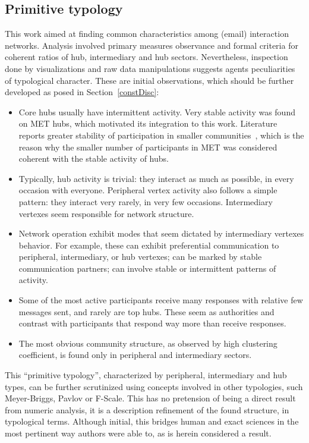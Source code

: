 \documentclass[%
 aip,
 jmp,%
 amsmath,amssymb,
 reprint,%
]{revtex4-1}
\begin{document}
    \subsection{Primitive typology}

This work aimed at finding common characteristics among (email) interaction networks. Analysis involved primary measures observance and formal criteria for coherent ratios of hub, intermediary and hub sectors. Nevertheless, inspection done by visualizations and raw data manipulations suggests agents peculiarities of typological character. These are initial observations, which should be further developed as posed in Section~\ref{constDisc}:

\begin{itemize}
    \item Core hubs usually have intermittent activity. Very stable activity was found on MET hubs, which motivated its integration to this work. Literature reports greater stability of participation in smaller communities~\cite{barabasiEvo}, which is the reason why the smaller number of participants in MET was considered coherent with the stable activity of hubs.
    \item Typically, hub activity is trivial: they interact as much as possible, in every occasion with everyone. Peripheral vertex activity also follows a simple pattern: they interact very rarely, in very few occasions. Intermediary vertexes seem responsible for network structure.
    \item Network operation exhibit modes that seem dictated by intermediary vertexes behavior. For example, these can exhibit preferential communication to peripheral, intermediary, or hub vertexes; can be marked by stable communication partners; can involve stable or intermittent patterns of activity.
    \item Some of the most active participants receive many responses with relative few messages sent, and rarely are top hubs. These seem as authorities and contrast with participants that respond way more than receive responses.
    \item The most obvious community structure, as observed by high clustering coefficient, is found only in peripheral and intermediary sectors.
\end{itemize}

This ``primitive typology'', characterized by peripheral, intermediary and hub types, can be further scrutinized using concepts involved in other typologies, such Meyer-Briggs, Pavlov or F-Scale. This has no pretension of being a direct result from numeric analysis, it is a description refinement of the found structure, in typological terms. Although initial, this bridges human and exact sciences in the most pertinent way authors were able to, as is herein considered a result.
\end{document}

